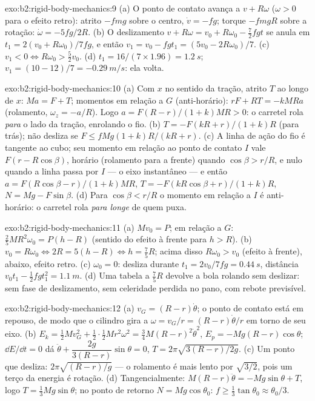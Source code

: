 \begin{solution}{exo:b2:rigid-body-mechanics:9}
(a) O ponto de contato avança a $v + R\omega$ ($\omega > 0$ para o
efeito retro): atrito $-fmg$ sobre o centro, $\dot v = -fg$; torque
$-fmgR$ sobre a rotação: $\dot\omega = -5fg/2R$. (b) O deslizamento $v + R\omega = v_0 +
R\omega_0 - \tfrac72fgt$ se anula em $t_1 = 2(v_0 + R\omega_0)/7fg$, e então $v_1
= v_0 - fgt_1 = (5v_0 - 2R\omega_0)/7$. (c) $v_1 < 0 \iff R\omega_0 > \tfrac52v_0$.
(d) $t_1 = 16/(7 \times 1.96) = \qty{1.2}{s}$; $v_1 = (10 - 12)/7 = \qty{-0.29}{m/s}$:
ela volta.
\end{solution}

\begin{solution}{exo:b2:rigid-body-mechanics:10}
(a) Com $x$ no sentido da tração, atrito $T$ ao longo de $x$: $Ma = F + T$;
momentos em relação a $G$ (anti-horário): $rF + RT = -kMRa$ (rolamento, $\omega_z
= -a/R$). Logo $a = F(R - r)/(1 + k)MR > 0$: o carretel rola
\emph{para} o lado da tração, enrolando o fio. (b) $T = -F(kR + r)/(1 +
k)R$ (para trás); não desliza se $F \le fMg(1 + k)R/(kR + r)$. (c) A linha de
ação do fio é tangente ao cubo; seu momento em relação ao ponto de
contato $I$ vale $F(r - R\cos\beta)$, horário (rolamento para a frente) quando $\cos\beta >
r/R$, e nulo quando a linha passa por $I$ --- o eixo instantâneo
--- e então $a = F(R\cos\beta - r)/(1 + k)MR$, $T = -F(kR\cos\beta + r)/(1 + k)R$,
$N = Mg - F\sin\beta$. (d) Para $\cos\beta < r/R$ o momento em relação a $I$ é
anti-horário: o carretel rola \emph{para longe} de quem puxa.
\end{solution}

\begin{solution}{exo:b2:rigid-body-mechanics:11}
(a) $Mv_0 = P$; em relação a $G$: $\tfrac25MR^2\omega_0 = P(h - R)$ (sentido do efeito à frente
para $h > R$). (b) $v_0 = R\omega_0 \iff 2R = 5(h - R) \iff h = \tfrac75R$; acima
disso $R\omega_0 > v_0$ (efeito à frente), abaixo, efeito retro. (c)
$\omega_0 = 0$: desliza durante $t_1 = 2v_0/7fg = \qty{0.44}{s}$, distância $v_0t_1 -
\tfrac12fgt_1^2 = \qty{1.1}{m}$. (d) Uma tabela a $\tfrac75R$ devolve a bola
rolando sem deslizar: sem fase de deslizamento, sem celeridade perdida no pano,
com rebote previsível.
\end{solution}

\begin{solution}{exo:b2:rigid-body-mechanics:12}
(a) $v_G = (R - r)\dot\theta$; o ponto de contato está em repouso, de modo que o
cilindro gira a $\omega = v_G/r = (R - r)\dot\theta/r$ em torno de seu eixo.
(b) $E_k = \tfrac12Mv_G^2 + \tfrac12\cdot\tfrac12Mr^2\omega^2 = \tfrac34M(R - r)^2
\dot\theta^2$, $E_p = -Mg(R - r)\cos\theta$; $\dd E/\dd t = 0$ dá $\ddot\theta
+ \dfrac{2g}{3(R - r)}\sin\theta = 0$, $T = 2\pi\sqrt{3(R - r)/2g}$. (c) Um
ponto que desliza: $2\pi\sqrt{(R - r)/g}$ --- o rolamento é mais lento por $\sqrt{3/2}$,
pois um terço da energia é rotação. (d) Tangencialmente: $M(R - r)\ddot\theta =
-Mg\sin\theta + T$, logo $T = \tfrac13Mg\sin\theta$; no ponto de retorno
$N = Mg\cos\theta_0$: $f \ge \tfrac13\tan\theta_0 \approx \theta_0/3$.
\end{solution}

